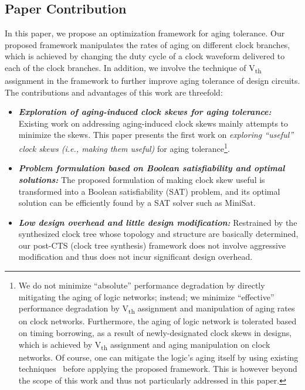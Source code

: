 \subsection{Paper Contribution}
\label{subsec:pc}
In this paper, we propose an optimization framework for aging tolerance. Our proposed framework manipulates the rates of aging on different clock branches, which is achieved by changing the duty cycle of a clock waveform delivered to each of the clock branches. In addition, we involve the technique of V\textsubscript{th} assignment in the framework to further improve aging tolerance of design circuits. The contributions and advantages of this work are threefold:




\begin{itemize}
\item \textbf{\textit{Exploration of aging-induced clock skews for aging tolerance:}} Existing work on addressing aging-induced clock skews mainly attempts to minimize the skews. This paper presents the first work on \textit{exploring \enquote{useful} clock skews (i.e., making them useful)} for aging tolerance\footnote[1]{We do not minimize \enquote{absolute} performance degradation by directly mitigating the aging of logic networks; instead; we minimize \enquote{effective} performance degradation by V\textsubscript{th} assignment and manipulation of aging rates on clock networks. Furthermore, the aging of logic network is tolerated based on timing borrowing, as a result of newly-designated clock skews in designs, which is achieved by V\textsubscript{th} assignment and aging manipulation on clock networks. Of course, one can mitigate the logic's aging itself by using existing techniques~\cite{kumar2007nbti, paul2006temporal, kang2007efficient, yang2007combating} before applying the proposed framework. This is however beyond the scope of this work and thus not particularly addressed in this paper.}.
\item  \textbf{\textit{Problem formulation based on Boolean satisfiability and optimal solutions:}} The proposed formulation of making clock skew useful is transformed into a Boolean satisfiability (SAT) problem, and its optimal solution can be efficiently found by a SAT solver such as MiniSat.
\item \textbf{\textit{Low design overhead and little design modification:}} Restrained by the synthesized clock tree whose topology and structure are basically determined, our post-CTS (clock tree synthesis) framework does not involve aggressive modification and thus does not incur significant design overhead.
\end{itemize}



